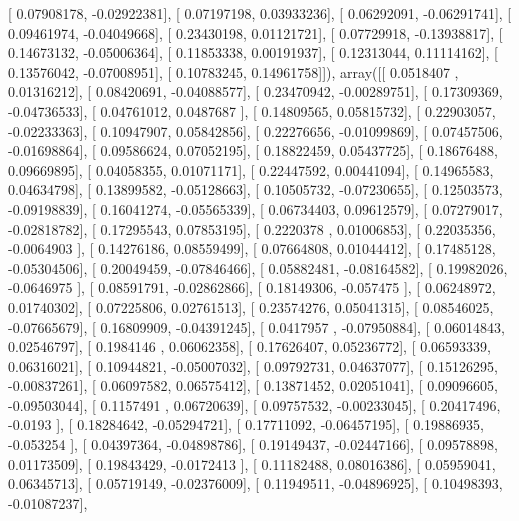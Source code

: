 \documentclass{article}
\begin{document}
       [ 0.07908178, -0.02922381],
       [ 0.07197198,  0.03933236],
       [ 0.06292091, -0.06291741],
       [ 0.09461974, -0.04049668],
       [ 0.23430198,  0.01121721],
       [ 0.07729918, -0.13938817],
       [ 0.14673132, -0.05006364],
       [ 0.11853338,  0.00191937],
       [ 0.12313044,  0.11114162],
       [ 0.13576042, -0.07008951],
       [ 0.10783245,  0.14961758]]), array([[ 0.0518407 ,  0.01316212],
       [ 0.08420691, -0.04088577],
       [ 0.23470942, -0.00289751],
       [ 0.17309369, -0.04736533],
       [ 0.04761012,  0.0487687 ],
       [ 0.14809565,  0.05815732],
       [ 0.22903057, -0.02233363],
       [ 0.10947907,  0.05842856],
       [ 0.22276656, -0.01099869],
       [ 0.07457506, -0.01698864],
       [ 0.09586624,  0.07052195],
       [ 0.18822459,  0.05437725],
       [ 0.18676488,  0.09669895],
       [ 0.04058355,  0.01071171],
       [ 0.22447592,  0.00441094],
       [ 0.14965583,  0.04634798],
       [ 0.13899582, -0.05128663],
       [ 0.10505732, -0.07230655],
       [ 0.12503573, -0.09198839],
       [ 0.16041274, -0.05565339],
       [ 0.06734403,  0.09612579],
       [ 0.07279017, -0.02818782],
       [ 0.17295543,  0.07853195],
       [ 0.2220378 ,  0.01006853],
       [ 0.22035356, -0.0064903 ],
       [ 0.14276186,  0.08559499],
       [ 0.07664808,  0.01044412],
       [ 0.17485128, -0.05304506],
       [ 0.20049459, -0.07846466],
       [ 0.05882481, -0.08164582],
       [ 0.19982026, -0.0646975 ],
       [ 0.08591791, -0.02862866],
       [ 0.18149306, -0.057475  ],
       [ 0.06248972,  0.01740302],
       [ 0.07225806,  0.02761513],
       [ 0.23574276,  0.05041315],
       [ 0.08546025, -0.07665679],
       [ 0.16809909, -0.04391245],
       [ 0.0417957 , -0.07950884],
       [ 0.06014843,  0.02546797],
       [ 0.1984146 ,  0.06062358],
       [ 0.17626407,  0.05236772],
       [ 0.06593339,  0.06316021],
       [ 0.10944821, -0.05007032],
       [ 0.09792731,  0.04637077],
       [ 0.15126295, -0.00837261],
       [ 0.06097582,  0.06575412],
       [ 0.13871452,  0.02051041],
       [ 0.09096605, -0.09503044],
       [ 0.1157491 ,  0.06720639],
       [ 0.09757532, -0.00233045],
       [ 0.20417496, -0.0193    ],
       [ 0.18284642, -0.05294721],
       [ 0.17711092, -0.06457195],
       [ 0.19886935, -0.053254  ],
       [ 0.04397364, -0.04898786],
       [ 0.19149437, -0.02447166],
       [ 0.09578898,  0.01173509],
       [ 0.19843429, -0.0172413 ],
       [ 0.11182488,  0.08016386],
       [ 0.05959041,  0.06345713],
       [ 0.05719149, -0.02376009],
       [ 0.11949511, -0.04896925],
       [ 0.10498393, -0.01087237],
\end{document}
